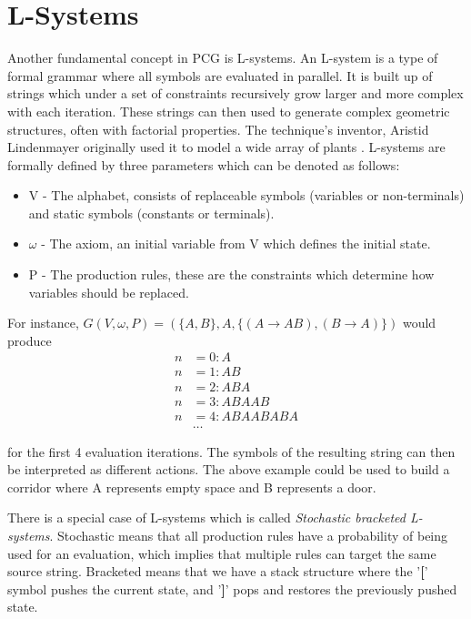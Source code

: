 \section{L-Systems}

Another fundamental concept in PCG is L-systems.
An L-system is a type of formal grammar where all symbols are evaluated in parallel.
It is built up of strings which under a set of constraints recursively grow larger and more complex with each iteration.
These strings can then used to generate complex geometric structures, often with factorial properties.
The technique's inventor, Aristid Lindenmayer originally used it to model a wide array of plants \cite{lsystem_book}.
L-systems are formally defined by three parameters which can be denoted as follows:

\begin{itemize}
  \item V  - The alphabet, consists of replaceable symbols (variables or non-terminals) and static symbols (constants or terminals).
  \item $\omega$ - The axiom, an initial variable from V which defines the initial state.
  \item P - The production rules, these are the constraints which determine how variables should be replaced.
\end{itemize}

For instance, $G(V, \omega, P) = (\{A, B\}, A, \{(A \to AB), (B \to A)\})$ would produce
\begin{align*}
  n &= 0: A \\
  n &= 1: AB \\
  n &= 2: ABA \\
  n &= 3: ABAAB \\
  n &= 4: ABAABABA \\
  &\dots
\end{align*}

for the first 4 evaluation iterations. The symbols of the resulting string can then be interpreted as different actions.
The above example could be used to build a corridor where A represents empty space and B represents a door.

There is a special case of L-systems which is called \textit{Stochastic bracketed L-systems}.
Stochastic means that all production rules have a probability of being used for an evaluation, which implies that multiple rules can target the same source string.
Bracketed means that we have a stack structure where the '\textbf{[}' symbol pushes the current state, and '\textbf{]}' pops and restores the previously pushed state.

